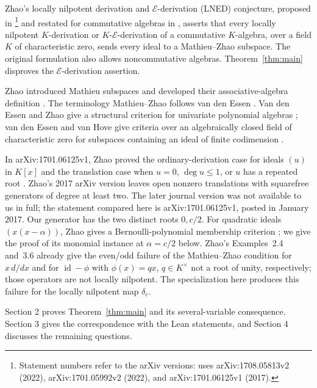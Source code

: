 \documentclass[11pt]{article}
\newcommand{\E}{\mathcal{E}}
\begin{document}
Zhao's locally nilpotent derivation and $\E$-derivation (LNED) conjecture,
proposed in \cite[Conjecture~1.6]{zhao-general}\footnote{Statement numbers refer to the arXiv versions:
\cite{essen-zhao-lfed} uses arXiv:1708.05813v2
(2022), \cite{zhao-general} arXiv:1701.05992v2 (2022), and \cite{zhao-univariate}
arXiv:1701.06125v1 (2017).} and restated for
commutative algebras in \cite[Conjecture~1.4]{zhao-univariate},
asserts that every locally
nilpotent $K$-derivation or $K$-$\E$-derivation of a commutative
$K$-algebra, over a field $K$ of characteristic zero, sends every ideal
to a Mathieu--Zhao subspace.
The original formulation also allows noncommutative algebras.
Theorem~\ref{thm:main} disproves the
$\E$-derivation assertion.

Zhao introduced Mathieu subspaces \cite[Definition~1.1]{zhao-origin}
and developed their associative-algebra definition
\cite[Definitions~1.1--1.2]{zhao-assoc}. The terminology Mathieu--Zhao
follows van den Essen \cite[\S\S1--2]{essen-intro}. Van den Essen and Zhao
give a structural criterion for univariate polynomial algebras
\cite[Theorem~4.1]{essen-zhao-univariate}; van den Essen and van Hove
give criteria over an algebraically closed field of characteristic zero
for subspaces containing an ideal of finite codimension
\cite[Theorem~1]{essen-hove}.

In arXiv:1701.06125v1, Zhao proved the ordinary-derivation case for ideals
$(u)$ in $K[x]$
and the translation case when $u=0$, $\deg u\le1$, or $u$ has a
repeated root \cite[Theorem~1.6(1),(3)]{zhao-univariate}.
Zhao's 2017 arXiv version \cite[Theorem~1.6 and the following paragraph]{zhao-univariate}
leaves open nonzero translations with squarefree generators of degree at least two.
The later journal version was not available to us in full; the statement
compared here is arXiv:1701.06125v1, posted in January 2017.
Our generator has the two
distinct roots $0,c/2$.
For quadratic ideals $(x(x-\alpha))$, Zhao gives a Bernoulli-polynomial
membership criterion \cite[Lemma~4.5 and Corollary~4.6]{zhao-univariate};
we give the proof of its monomial instance at $\alpha=c/2$ below.
Zhao's Examples~2.4 and~3.6 \cite{zhao-univariate} already give the even/odd failure of the
Mathieu--Zhao condition for
$x\,d/dx$ and for $\operatorname{id}-\phi$ with $\phi(x)=qx$,
$q\in K^\times$ not a root of unity, respectively; those operators are
not locally nilpotent. The specialization here produces this failure
for the locally nilpotent map $\delta_c$.

Section 2 proves Theorem~\ref{thm:main} and its several-variable
consequence. Section 3 gives the correspondence with the Lean statements,
and Section 4 discusses the remaining questions.
\end{document}
